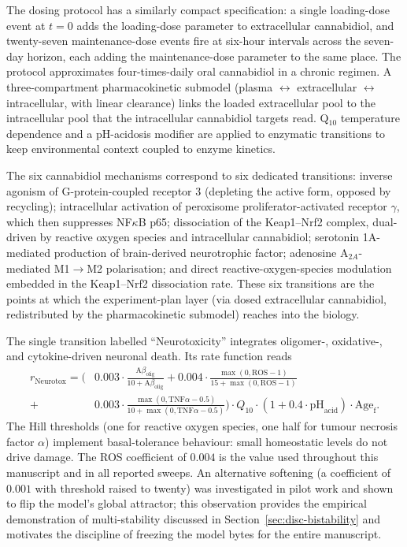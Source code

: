 \documentclass[10pt,letterpaper]{article}
\begin{document}
The dosing protocol has a similarly compact specification: a single loading-dose event at $t = 0$ adds the loading-dose parameter to extracellular cannabidiol, and twenty-seven maintenance-dose events fire at six-hour intervals across the seven-day horizon, each adding the maintenance-dose parameter to the same place. The protocol approximates four-times-daily oral cannabidiol in a chronic regimen. A three-compartment pharmacokinetic submodel (plasma $\leftrightarrow$ extracellular $\leftrightarrow$ intracellular, with linear clearance) links the loaded extracellular pool to the intracellular pool that the intracellular cannabidiol targets read. Q$_{10}$ temperature dependence and a pH-acidosis modifier are applied to enzymatic transitions to keep environmental context coupled to enzyme kinetics.

The six cannabidiol mechanisms correspond to six dedicated transitions: inverse agonism of G-protein-coupled receptor 3 (depleting the active form, opposed by recycling); intracellular activation of peroxisome proliferator-activated receptor $\gamma$, which then suppresses NF$\kappa$B p65; dissociation of the Keap1--Nrf2 complex, dual-driven by reactive oxygen species and intracellular cannabidiol; serotonin 1A-mediated production of brain-derived neurotrophic factor; adenosine A$_{2A}$-mediated M1$\to$M2 polarisation; and direct reactive-oxygen-species modulation embedded in the Keap1--Nrf2 dissociation rate. These six transitions are the points at which the experiment-plan layer (via dosed extracellular cannabidiol, redistributed by the pharmacokinetic submodel) reaches into the biology.

The single transition labelled ``Neurotoxicity'' integrates oligomer-, oxidative-, and cytokine-driven neuronal death. Its rate function reads
\begin{align}
r_{\text{Neurotox}} = \big( & 0.003 \cdot \tfrac{\text{A}\beta_{\text{olig}}}{10 + \text{A}\beta_{\text{olig}}}
+ 0.004 \cdot \tfrac{\max(0, \text{ROS}-1)}{15 + \max(0, \text{ROS}-1)} \nonumber \\
+ & 0.003 \cdot \tfrac{\max(0, \text{TNF}\alpha-0.5)}{10 + \max(0, \text{TNF}\alpha-0.5)} \big) \cdot Q_{10} \cdot (1 + 0.4 \cdot \text{pH}_{\text{acid}}) \cdot \text{Age}_{\text{f}} .
\end{align}
The Hill thresholds (one for reactive oxygen species, one half for tumour necrosis factor $\alpha$) implement basal-tolerance behaviour: small homeostatic levels do not drive damage. The ROS coefficient of $0.004$ is the value used throughout this manuscript and in all reported sweeps. An alternative softening (a coefficient of $0.001$ with threshold raised to twenty) was investigated in pilot work and shown to flip the model's global attractor; this observation provides the empirical demonstration of multi-stability discussed in Section~\ref{sec:disc-bistability} and motivates the discipline of freezing the model bytes for the entire manuscript.
\end{document}
